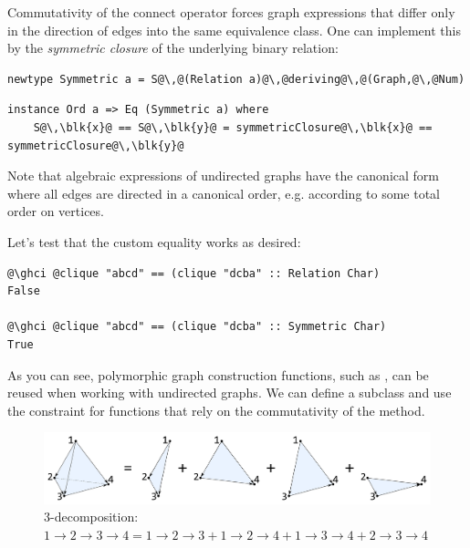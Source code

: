 Commutativity of the connect operator forces graph expressions that differ only
in the direction of edges into the same equivalence class. One can implement
this by the \emph{symmetric closure} of the underlying binary relation:

\begin{verbatim}
newtype Symmetric a = S@\,@(Relation a)@\,@deriving@\,@(Graph,@\,@Num)
\end{verbatim}
\vspace{1mm}
\begin{verbatim}
instance Ord a => Eq (Symmetric a) where
    S@\,\blk{x}@ == S@\,\blk{y}@ = symmetricClosure@\,\blk{x}@ == symmetricClosure@\,\blk{y}@
\end{verbatim}

Note that algebraic expressions of undirected graphs have the canonical form where all
edges are directed in a canonical order, e.g. according to some total order on vertices.

Let's test that the custom equality works as desired:

\begin{verbatim}
@\ghci @clique "abcd" == (clique "dcba" :: Relation Char)
False

@\ghci @clique "abcd" == (clique "dcba" :: Symmetric Char)
True
\end{verbatim}

As you can see, polymorphic graph construction functions, such as ,
can be reused when working with undirected graphs. We can define a subclass
 and use the
constraint for functions that rely on the commutativity of the  method.

\begin{figure}
\centerline{\includegraphics[scale=0.12]{fig/3-decomposition.pdf}}
\caption{3-decomposition:
    $1 \rightarrow 2 \rightarrow 3 \rightarrow 4 =
    1 \rightarrow 2 \rightarrow 3 + 1 \rightarrow 2 \rightarrow 4 +
    1 \rightarrow 3 \rightarrow 4 + 2 \rightarrow 3 \rightarrow 4$
    \label{fig-3-decomposition}}
\end{figure}

